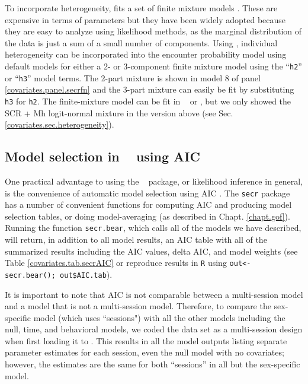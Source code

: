 To incorporate heterogeneity, \secr fits a set of 
finite mixture models \citep{norris_pollock:1996,
  pledger:2000}. These are expensive in terms of parameters but 
they have been widely adopted because they are easy to analyze using
likelihood methods, as the marginal distribution of the data is just a
sum of a small number of components.
Using \secr,  individual heterogeneity can be incorporated
into the encounter probability model using default models for 
 either a 2- or 3-component finite
mixture model 
using the  ``\mbox{\tt h2}'' or
``\mbox{\tt h3}'' model terms.
 The 2-part mixture is shown in model 8 of panel
\ref{covariates.panel.secrfn} and the 3-part mixture can easily be fit by
substituting \mbox{\tt h3} for \mbox{\tt h2}.  
The finite-mixture model 
can be fit in \jags~ or \bugs, but we only showed
the SCR + Mh logit-normal mixture in the version above (see
Sec. \ref{covariates.sec.heterogeneity}).



\subsection{Model selection in \secr~ using AIC}

One practical advantage to using the \secr~ package, or likelihood
inference in general, is the convenience of automatic model selection
using AIC \citep{burnham_anderson:2002}. The \mbox{\tt secr} package
has a number of convenient functions for computing AIC and producing
model selection tables, or doing model-averaging (as described in
 Chapt. \ref{chapt.gof}).
Running the function {\tt secr.bear}, which calls all of the models we
have described, will return, in addition to all model results, 
an AIC table with all of the summarized results including the AIC values,
delta AIC, and model weights (see Table \ref{covariates.tab.secrAIC}
or reproduce results in {\tt R} using {\tt out<- secr.bear(); out\$AIC.tab}). 


It is important to note that AIC is not comparable 
between a multi-session model and a model that is not a multi-session model.
Therefore, to compare the sex-specific model (which uses ``sessions") with all the other models
including the null, time, and behavioral models, we coded the data set as a 
multi-session design when first loading it to \secr.  This results in 
all the model outputs listing separate parameter estimates for each session, even the null model
with no covariates; however, the estimates are the same for both ``sessions''
in all but the sex-specific model. 


